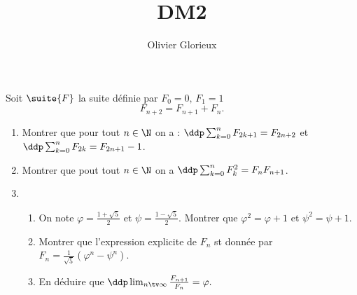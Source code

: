 \documentclass[a4paper, 11pt,reqno]{article}
\author{Olivier Glorieux}
\begin{document}
\title{DM2 \\
}


\begin{exercice}
Soit $\suite{F}$ la suite définie par $F_0 =0, \, F_1=1 $  
$$ F_{n+2} = F_{n+1} +F_n.$$

\begin{enumerate}
\item Montrer que pour tout $n\in \N$ on a : $\ddp \sum_{k=0}^n F_{2k+1} =F_{2n+2}$
et $\ddp \sum_{k=0}^n F_{2k} =F_{2n+1}-1$.
\item Montrer que pout tout $n\in \N$ on a $\ddp \sum_{k=0}^n F_{k}^2 =F_nF_{n+1}$.
\item \begin{enumerate}
\item On note $\varphi = \frac{1+\sqrt{5}}{2}$ et $\psi=\frac{1-\sqrt{5}}{2}$. Montrer que 
$\varphi^2 =\varphi+1$ et $\psi^2 =\psi+1$.
\item Montrer que l'expression explicite de $F_n$ st donnée par $F_n =\frac{1}{\sqrt{5}}(\varphi^n-\psi^n)$.
\item En déduire que $\ddp \lim_{n\tv \infty} \frac{F_{n+1}}{F_n}=\varphi.$
\end{enumerate}
\end{enumerate}

\end{exercice}
\end{document}
